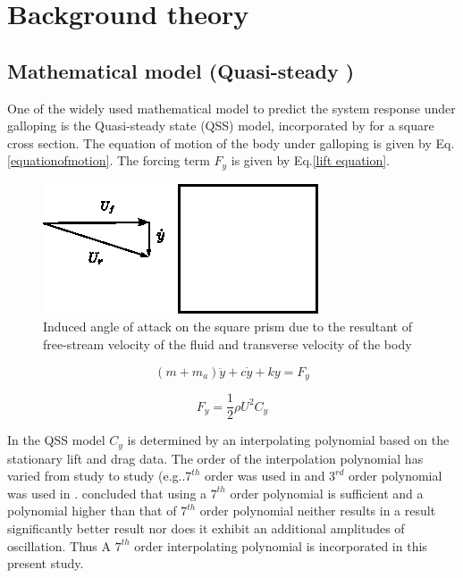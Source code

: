 
\section{Background theory}

\subsection{Mathematical model (Quasi-steady )}

 One of the widely used mathematical model to predict the system response under galloping is the Quasi-steady state (QSS) model, incorporated by \cite{Parkinson1964} for a square cross section. The equation of motion of the body under galloping is given by Eq. \eqref{equationofmotion}. The forcing term $F_y$ is given by Eq.\eqref{lift equation}.
 
 \begin{figure}
\centering
\includegraphics[width=0.5\linewidth]{../FnP/setup_1}
\caption{Induced angle of attack on the square prism due to the resultant of free-stream velocity of the fluid and transverse velocity of the body }
\label{fig:setup_1}
\end{figure}


\begin{equation}
\label{equationofmotion}
(m+m_a)\ddot{y}+c\dot{y}+ky=F_y
\end{equation}

\begin{equation}
\label{lift equation}
F_y=\frac{1}{2}\rho U^2C_y
\end{equation}

 In the QSS  model $C_y$ is determined by an interpolating polynomial based on the stationary lift and drag data. The order of the interpolation polynomial has varied from study to study (e.g..$7^{th}$ order was used in \cite{Parkinson1964} and $3^{rd}$ order polynomial was used in \cite{Barrero-Gil2009}. \cite{Ng2005} concluded that using a $7^{th}$ order polynomial is sufficient and a polynomial higher than that of $7^{th}$ order polynomial neither results in a result significantly better result nor does it exhibit an additional amplitudes of oscillation. Thus A $7 ^{th}$ order interpolating polynomial is incorporated in this present study. 

